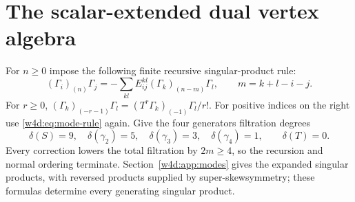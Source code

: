 \section{The scalar-extended dual vertex algebra}\label{w4d:sec:dual}
For $n\geq0$ impose the following finite recursive singular-product rule:
\begin{equation}\label{w4d:eq:mode-rule}
 (\Gamma_i)_{(n)}\Gamma_j
   =-\sum_{kl}E_{ij}^{kl}(\Gamma_k)_{(n-m)}\Gamma_l,
 \qquad m=k+l-i-j.
\end{equation}
For $r\geq0$, $(\Gamma_k)_{(-r-1)}\Gamma_l=(T^r\Gamma_k)_{(-1)}\Gamma_l/r!$.
For positive indices on the right use \eqref{w4d:eq:mode-rule} again. Give the four generators filtration degrees
\begin{equation}\label{w4d:eq:dual-filtration}
 \delta(S)=9,\quad\delta(\gamma_2)=5,\quad\delta(\gamma_3)=3,
 \quad\delta(\gamma_4)=1,\qquad\delta(T)=0.
\end{equation}
Every correction lowers the total filtration by $2m\geq4$, so the recursion and normal ordering terminate. Section~\ref{w4d:app:modes} gives the expanded singular products, with reversed products supplied by super-skewsymmetry; these formulas determine every generating singular product.

